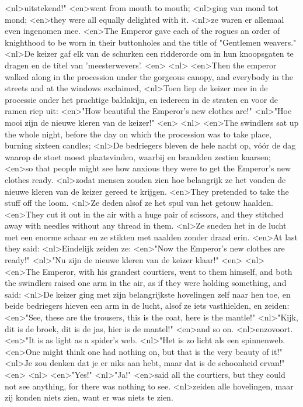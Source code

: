 <nl>uitstekend!"
<en>went from mouth to mouth;
<nl>ging van mond tot mond;
<en>they were all equally delighted with it.
<nl>ze waren er allemaal even ingenomen mee.
<en>The Emperor gave each of the rogues an order of knighthood to be worn in their buttonholes and the title of "Gentlemen weavers."
<nl>De keizer gaf elk van de schurken een ridderorde om in hun knoopsgaten te dragen en de titel van 'meesterwevers'.
<en>
<nl>
<en>Then the emperor walked along in the procession under the gorgeous canopy, and everybody in the streets and at the windows exclaimed,
<nl>Toen liep de keizer mee in de processie onder het prachtige baldakijn, en iedereen in de straten en voor de ramen riep uit:
<en>"How beautiful the Emperor's new clothes are!"
<nl>"Hoe mooi zijn de nieuwe kleren van de keizer!"
<en>
<nl>
<en>The swindlers sat up the whole night, before the day on which the procession was to take place, burning sixteen candles;
<nl>De bedriegers bleven de hele nacht op, vóór de dag waarop de stoet moest plaatsvinden, waarbij en brandden zestien kaarsen;
<en>so that people might see how anxious they were to get the Emperor's new clothes ready.
<nl>zodat mensen zouden zien hoe belangrijk ze het vonden de nieuwe kleren van de keizer gereed te krijgen.
<en>They pretended to take the stuff off the loom.
<nl>Ze deden alsof ze het spul van het getouw haalden.
<en>They cut it out in the air with a huge pair of scissors, and they stitched away with needles without any thread in them.
<nl>Ze sneden het in de lucht met een enorme schaar en ze stikten met naalden zonder draad erin.
<en>At last they said:
<nl>Eindelijk zeiden ze:
<en>"Now the Emperor's new clothes are ready!"
<nl>"Nu zijn de nieuwe kleren van de keizer klaar!"
<en>
<nl>
<en>The Emperor, with his grandest courtiers, went to them himself, and both the swindlers raised one arm in the air, as if they were holding something, and said:
<nl>De keizer ging met zijn belangrijkste hovelingen zelf naar hen toe, en beide bedriegers hieven een arm in de lucht, alsof ze iets vasthielden, en zeiden:
<en>"See, these are the trousers, this is the coat, here is the mantle!"
<nl>"Kijk, dit is de broek, dit is de jas, hier is de mantel!"
<en>and so on.
<nl>enzovoort.
<en>"It is as light as a spider's web.
<nl>"Het is zo licht als een spinnenweb.
<en>One might think one had nothing on, but that is the very beauty of it!"
<nl>Je zou denken dat je er niks aan hebt, maar dat is de schoonheid ervan!"
<en>
<nl>
<en>"Yes!"
<nl>"Ja!"
<en>said all the courtiers, but they could not see anything, for there was nothing to see.
<nl>zeiden alle hovelingen, maar zij konden niets zien, want er was niets te zien.
